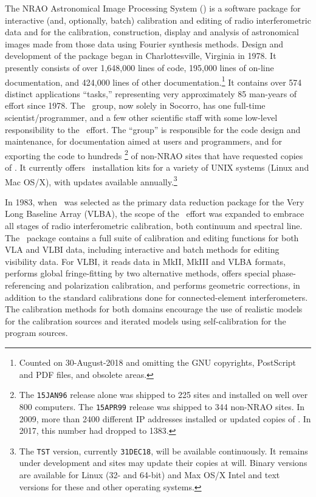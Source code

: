     The NRAO Astronomical Image Processing System (\AIPS{})
is a software package for interactive (and, optionally, batch)
calibration and editing of radio interferometric data and for the
calibration, construction, display and analysis of astronomical images
made from those data using Fourier synthesis methods.  Design and
development of the package began in Charlottesville, Virginia in 1978.
It presently consists of over 1,648,000 lines of code, 195,000 lines
of on-line documentation, and 424,000 lines of other
documentation.\footnote{Counted on 30-August-2018 and omitting the
GNU copyrights, PostScript and PDF files, and obsolete areas.}  It
contains over 574 distinct applications ``tasks,'' representing very
approximately 85 man-years of effort since 1978.  The \AIPS\ group,
now solely in Socorro, has one full-time scientist/programmer, and a
few other scientific staff with some low-level responsibility to the
\AIPS\ effort.  The ``group'' is responsible for the code design and
maintenance, for documentation aimed at users and programmers, and for
exporting the code to hundreds \footnote{The {\tt 15JAN96} release
alone was shipped to 225 sites and installed on well over 800
computers.  The {\tt 15APR99} release was shipped to 344 non-NRAO
sites.  In 2009, more than 2400 different IP addresses installed or
updated copies of \AIPS\@.  In 2017, this number had dropped to 1383.}
of non-NRAO sites that have requested copies of \AIPS\@.  It currently
offers \AIPS\ installation kits for a variety of UNIX systems (Linux
and Mac OS/X), with updates available annually.\footnote{The {\tt TST}
version, currently {\tt 31DEC18}, will be available continuously. It
remains under development and sites may update their copies at will.
Binary versions are available for Linux (32- and 64-bit) and Max OS/X
Intel and text versions for these and other operating systems.}

    In 1983, when \AIPS\ was selected as the primary data reduction
package for the Very Long Baseline Array (VLBA), the scope of the \AIPS\
effort was expanded to embrace all stages of radio interferometric
calibration, both continuum and spectral line.  The \AIPS\ package
contains a full suite of calibration and editing functions for both
VLA and VLBI data, including interactive and batch methods for editing
visibility data.  For VLBI, it reads data in MkII, MkIII and VLBA
formats, performs global fringe-fitting by two alternative methods,
offers special phase-referencing and polarization calibration, and
performs geometric corrections, in addition to the standard
calibrations done for connected-element interferometers.  The
calibration methods for both domains encourage the use of realistic
models for the calibration sources and iterated models using
self-calibration for the program sources.

